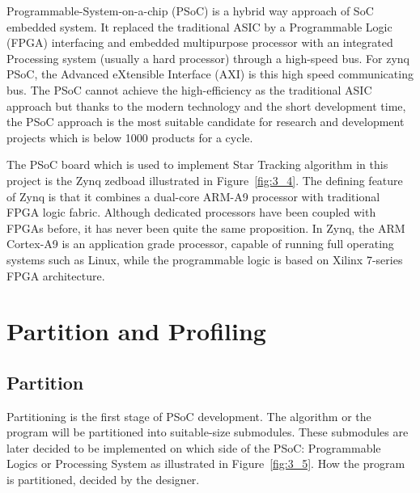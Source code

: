 
\noindent Programmable-System-on-a-chip (PSoC) is a hybrid way approach of SoC embedded system. It replaced the traditional ASIC by a Programmable Logic (FPGA) interfacing and embedded multipurpose processor with an integrated Processing system (usually a hard processor) through a high-speed bus. For zynq PSoC, the Advanced eXtensible Interface (AXI) is this high speed communicating bus. The PSoC cannot achieve the high-efficiency as the traditional ASIC approach but thanks to the modern technology and the short development time, the PSoC approach is the most suitable candidate for research and development projects which is below 1000 products for a cycle. \\


\noindent The PSoC board which is used to implement Star Tracking algorithm in this project is the Zynq zedboad illustrated in Figure~\ref{fig:3_4}. The defining feature of Zynq is that it combines a dual-core ARM-A9 processor with traditional FPGA logic fabric\cite{Xilinx}. Although dedicated processors have been coupled with FPGAs before, it has never been quite the same proposition. In Zynq, the ARM Cortex-A9 is an application grade processor, capable of running full operating systems such as Linux, while the programmable logic is based on Xilinx 7-series FPGA architecture. \\


\section{Partition and Profiling}

\subsection{Partition}

Partitioning is the first stage of PSoC development. The algorithm or the program will be partitioned into suitable-size submodules. These submodules are later decided to be implemented on which side of the PSoC: Programmable Logics or Processing System as illustrated in Figure~\ref{fig:3_5}. How the program is partitioned, decided by the designer. \\

